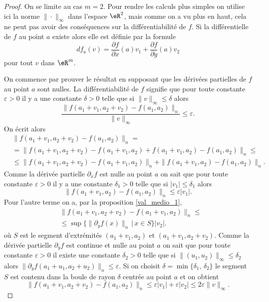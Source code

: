 \begin{proof} 
 On se limite au cas $m=2$.  Pour rendre les calculs plus simples on utilise ici la norme $\|\cdot\|_\infty$ dans l'espace $\eR^2$, mais comme on a vu plus en haut, cela ne peut pas avoir des conséquences sur la différentiabilité de $f$. Si la différentielle de $f$ au point $a$ existe alors elle est définie par la formule
\[
    df_a(v)=\frac{ \partial f }{ \partial x }(a)v_1+\frac{ \partial f }{ \partial y }(a)v_2
\] 
pour tout $v$ dans $\eR^m$. 

On commence par prouver le résultat en supposant que les dérivées partielles de $f$ au point $a$ sont nulles. La différentiabilité de $f$ signifie que pour toute constante  $\varepsilon> 0$ il y a une constante $\delta>0$ telle que si $\|v\|_\infty\leq \delta $ alors 
\[
\frac{\|f(a_1+v_1, a_2+v_2)-f(a_1, a_2)\|_n}{\|v\|_\infty}\leq \varepsilon. 
\]   
On écrit alors 
\begin{equation}
  \begin{aligned}
   & \|f(a_1+v_1, a_2+v_2)-f(a_1, a_2)\|_n=\\
&=\|f(a_1+v_1, a_2+v_2)-f(a_1+v_1, a_2)+f(a_1+v_1, a_2)-f(a_1, a_2)\|_n\leq\\
&\leq \|f(a_1+v_1, a_2+v_2)-f(a_1+v_1, a_2)\|_n+\|f(a_1+v_1, a_2)-f(a_1, a_2)\|_n.
  \end{aligned}
\end{equation}
Comme la dérivée partielle $\partial_x f$ est  nulle au point $a$  on sait que  pour toute constante  $\varepsilon> 0$ il y a une constante $\delta_1>0$ telle que si $|v_1|\leq \delta_1 $ alors
\[
\|f(a_1+v_1, a_2)-f(a_1, a_2)\|_n\leq \varepsilon |v_1|.
\] 
Pour l'autre terme on a, par la proposition \ref{val_medio_1},
\begin{equation}
  \begin{aligned}
   & \|f(a_1+v_1, a_2+v_2)-f(a_1+v_1, a_2)\|_n\leq \\
&\leq \sup\{\|\partial_yf(x)\|_n\,\vert\, x\in S\}|v_2|.
  \end{aligned}
\end{equation}
où $S$ est le segment d'extrémités  $(a_1+v_1, a_2)$ et $ (a_1+v_1, a_2+v_2)$. Comme la  dérivée partielle $\partial_y f$ est continue et nulle au point $a$ on sait que  pour toute constante  $\varepsilon> 0$ il existe une constante $\delta_2>0$ telle que si $\|(u_1,u_2)\|_\infty\leq \delta_2 $ alors $\|\partial_yf(a_1+u_1,a_2+u_2)\|_n\leq \varepsilon$. Si on choisit $\delta = \min\{\delta_1,\,\delta_2\}$ le segment $S$ est contenu dans la boule de rayon $\delta$ centrée au point $a$ et on obtient
\[
 \|f(a_1+v_1, a_2+v_2)-f(a_1, a_2)\|_n\leq \varepsilon |v_1|+\varepsilon |v_2|\leq 2\varepsilon \|v\|_\infty.
\]


\end{proof}
